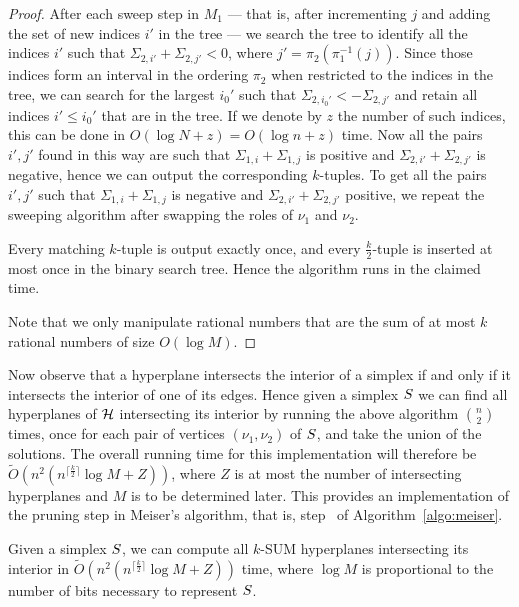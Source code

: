 \begin{proof}
	After each sweep step in $M_1$ --- that is, after incrementing $j$ and
	adding the set of new indices $i'$ in the tree --- we search the tree to
	identify all the indices $i'$ such that $\Sigma_{2,i'} + \Sigma_{2,j'} <
	0$, where $j' = \pi_2(\pi_1^{-1}(j))$. Since those indices form an interval
	in the ordering $\pi_2$ when restricted to the indices in the tree, we can
	search for the largest $i_0'$ such that $\Sigma_{2,i_0'} < -\Sigma_{2,j'}$
	and retain all indices $i' \le i_0'$ that are in the tree. If we denote by
	$z$ the number of such indices, this can be done in $O(\log N + z) = O(\log
	n + z)$ time. Now all the pairs $i', j'$ found in this way are such that
	$\Sigma_{1,i} + \Sigma_{1,j}$ is positive and $\Sigma_{2,i'} +
	\Sigma_{2,j'}$ is negative, hence we can output the corresponding
	$k$-tuples. To get all the pairs $i', j'$ such that
	$\Sigma_{1,i} + \Sigma_{1,j}$ is negative and $\Sigma_{2,i'} +
	\Sigma_{2,j'}$ positive, we repeat the sweeping algorithm after swapping the
	roles of $\nu_1$ and $\nu_2$.

	Every matching $k$-tuple is output exactly once, and every
	$\frac{k}{2}$-tuple is inserted at most once in the binary search tree.
	Hence the algorithm runs in the claimed time.

	Note that we only manipulate rational numbers that are the sum of at most
	$k$ rational numbers of size $O(\log M)$.
\end{proof}

Now observe that a hyperplane intersects the interior of a simplex if and only
if it intersects the interior of one of its edges. Hence given a simplex
$S$ we can find all hyperplanes of $\mathcal{H}$ intersecting its interior by
running the above algorithm ${n\choose 2}$ times, once for each pair of
vertices $(\nu_1,\nu_2)$ of $S$, and take the union of the solutions.
The overall running time for this implementation will therefore be
$\tilde{O}(n^2 (n^{\lceil \frac k2 \rceil} \log M + Z))$, where $Z$ is at most the
number of intersecting hyperplanes and $M$ is to be determined later.
This provides an implementation of the pruning step in Meiser's algorithm, that
is, step~ of Algorithm~\ref{algo:meiser}.

\begin{corollary}\label{cor:double}
	Given a simplex $S$, we can compute all $k$-SUM hyperplanes
	intersecting its interior in $\tilde{O}(n^2 (n^{\lceil \frac k2 \rceil}
	\log M + Z))$ time, where $\log M$ is proportional to the number of bits
	necessary to represent $S$.
\end{corollary}


